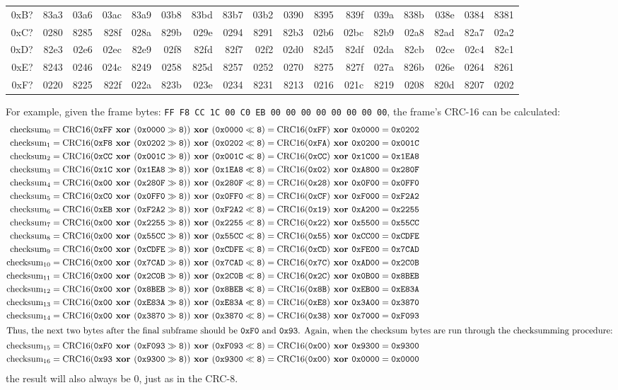 \begin{table}[h]
{\begin{tabular}{|r||r|r|r|r|r|r|r|r|r|r|r|r|r|r|r|r|}
0xB? & 83a3 & 03a6 & 03ac & 83a9 & 03b8 & 83bd & 83b7 & 03b2 & 0390 & 8395 & 839f & 039a & 838b & 038e & 0384 & 8381 \\
0xC? & 0280 & 8285 & 828f & 028a & 829b & 029e & 0294 & 8291 & 82b3 & 02b6 & 02bc & 82b9 & 02a8 & 82ad & 82a7 & 02a2 \\
0xD? & 82e3 & 02e6 & 02ec & 82e9 & 02f8 & 82fd & 82f7 & 02f2 & 02d0 & 82d5 & 82df & 02da & 82cb & 02ce & 02c4 & 82c1 \\
0xE? & 8243 & 0246 & 024c & 8249 & 0258 & 825d & 8257 & 0252 & 0270 & 8275 & 827f & 027a & 826b & 026e & 0264 & 8261 \\
0xF? & 0220 & 8225 & 822f & 022a & 823b & 023e & 0234 & 8231 & 8213 & 0216 & 021c & 8219 & 0208 & 820d & 8207 & 0202 \\
\hline
\end{tabular}
}
\end{table}
\par
\noindent
For example, given the frame bytes:
\texttt{FF F8 CC 1C 00 C0 EB 00 00 00 00 00 00 00 00},
the frame's CRC-16 can be calculated:
{
\begin{align*}
\CRCSIXTEEN{0}{0xFF}{0x0000}{0xFF}{0x0000}{0x0202} \\
\CRCSIXTEEN{1}{0xF8}{0x0202}{0xFA}{0x0200}{0x001C} \\
\CRCSIXTEEN{2}{0xCC}{0x001C}{0xCC}{0x1C00}{0x1EA8} \\
\CRCSIXTEEN{3}{0x1C}{0x1EA8}{0x02}{0xA800}{0x280F} \\
\CRCSIXTEEN{4}{0x00}{0x280F}{0x28}{0x0F00}{0x0FF0} \\
\CRCSIXTEEN{5}{0xC0}{0x0FF0}{0xCF}{0xF000}{0xF2A2} \\
\CRCSIXTEEN{6}{0xEB}{0xF2A2}{0x19}{0xA200}{0x2255} \\
\CRCSIXTEEN{7}{0x00}{0x2255}{0x22}{0x5500}{0x55CC} \\
\CRCSIXTEEN{8}{0x00}{0x55CC}{0x55}{0xCC00}{0xCDFE} \\
\CRCSIXTEEN{9}{0x00}{0xCDFE}{0xCD}{0xFE00}{0x7CAD} \\
\CRCSIXTEEN{10}{0x00}{0x7CAD}{0x7C}{0xAD00}{0x2C0B} \\
\CRCSIXTEEN{11}{0x00}{0x2C0B}{0x2C}{0x0B00}{0x8BEB} \\
\CRCSIXTEEN{12}{0x00}{0x8BEB}{0x8B}{0xEB00}{0xE83A} \\
\CRCSIXTEEN{13}{0x00}{0xE83A}{0xE8}{0x3A00}{0x3870} \\
\CRCSIXTEEN{14}{0x00}{0x3870}{0x38}{0x7000}{0xF093} \\
\intertext{Thus, the next two bytes after the final subframe should be
\texttt{0xF0} and \texttt{0x93}.
Again, when the checksum bytes are run through the checksumming procedure:}
\CRCSIXTEEN{15}{0xF0}{0xF093}{0x00}{0x9300}{0x9300} \\
\CRCSIXTEEN{16}{0x93}{0x9300}{0x00}{0x0000}{0x0000}
\end{align*}
the result will also always be 0, just as in the CRC-8.
}

